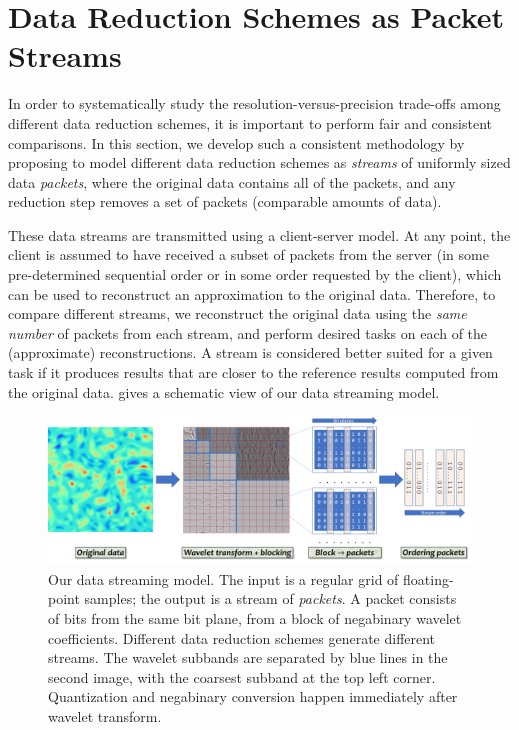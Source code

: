 \section{Data Reduction Schemes as Packet Streams}\label{sec:terminologies}

In order to systematically study the resolution-versus-precision trade-offs among different data
reduction schemes, it is important to perform fair and consistent comparisons. In this section, we
develop such a consistent methodology by proposing to model different data reduction schemes as
\emph{streams} of uniformly sized data \emph{packets}, where the original data contains all of the
packets, and any reduction step removes a set of packets (comparable amounts of data).

These data streams are transmitted using a client-server model. At any point, the client is assumed
to have received a subset of packets from the server (in some pre-determined sequential order or in
some order requested by the client), which can be used to reconstruct an approximation to the
original data. Therefore, to compare different streams, we reconstruct the original data using the
\emph{same number} of packets from each stream, and perform desired tasks on each of the
(approximate) reconstructions. A stream is considered better suited for a given task if it produces
results that are closer to the reference results computed from the original data.
 gives a schematic view of our data streaming model.

\begin{figure}[!b]
\centering
\includegraphics[width=\linewidth]{img/pipeline.png}
\caption{Our data streaming model. The input is a regular grid of floating-point samples;
the output is a stream of \emph{packets}. A packet consists of bits from the same bit plane, from a
block of negabinary wavelet coefficients. Different data reduction schemes generate different
streams.  The wavelet subbands are separated by blue lines in the second image, with the coarsest
subband at the top left corner. 
Quantization and negabinary conversion
happen immediately after wavelet transform.
}\label{fig:pipeline}
\end{figure}

